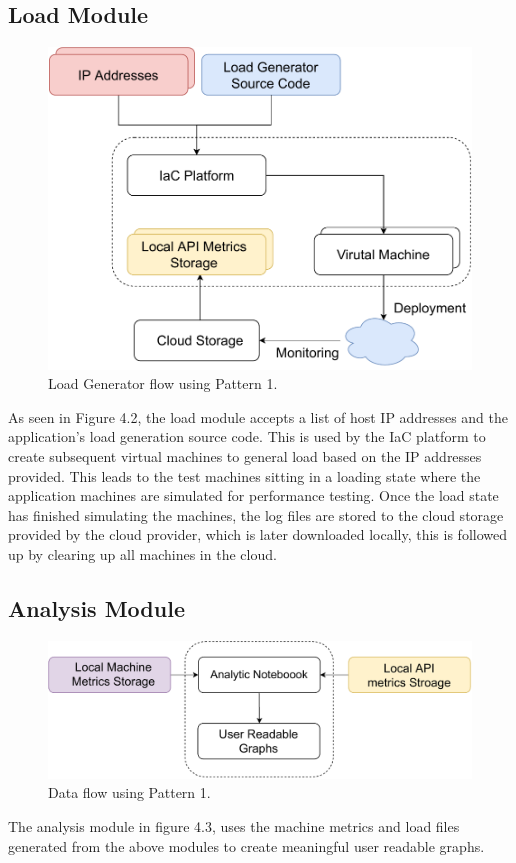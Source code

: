 \subsection{Load Module}
\begin{figure}[H]
    \centering
    \includegraphics[width=0.7\linewidth]{images/modular_load.pdf}
    \caption{Load Generator flow using Pattern 1.}
\end{figure} 
As seen in Figure 4.2, the load module accepts a list of host IP addresses and the application's load generation source code. This is used by the IaC platform to create subsequent virtual machines to general load based on the IP addresses provided. This leads to the test machines sitting in a loading state where the application machines are simulated for performance testing. Once the load state has finished simulating the machines, the log files are stored to the cloud storage provided by the cloud provider, which is later downloaded locally, this is followed up by clearing up all machines in the cloud. 

\subsection{Analysis Module}
\begin{figure}[H]
    \centering
    \includegraphics[width=0.5\linewidth]{images/Data Flow.pdf}
    \caption{Data flow using Pattern 1.}
\end{figure} 
The analysis module in figure 4.3, uses the machine metrics and load files generated from the above modules to create meaningful user readable graphs. 

